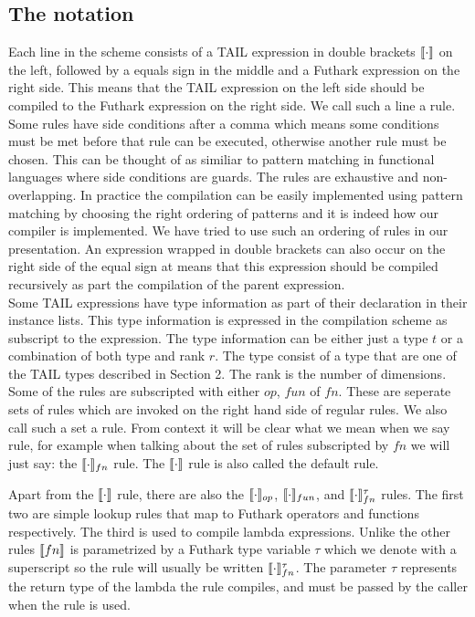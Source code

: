 \documentclass[11pt]{article}
\begin{document}
\subsection{The notation}
Each line in the scheme consists of a TAIL expression in double brackets $\llbracket \cdot \rrbracket$ on the left, followed by a
equals sign in the middle and a Futhark expression on the right side. This means that the TAIL expression on the left
side should be compiled to the Futhark expression on the right side. We call such a line a rule. Some rules have side
conditions after a comma which means some conditions must be met before that rule can be executed, otherwise another
rule must be chosen. This can be thought of as similiar to pattern matching in functional languages where side conditions
are guards. The rules are exhaustive and non-overlapping.
In practice the compilation can be easily implemented using pattern matching by choosing the right ordering of patterns
and it is indeed how our compiler is implemented.
We have tried to use such an ordering of rules in our presentation.
An expression wrapped in double brackets can also occur on the right side of the equal sign at means that this expression
should be compiled recursively as part the compilation of the parent expression.\\

Some TAIL expressions have type information as part of their declaration in their instance lists.
This type information is expressed in the compilation scheme as subscript to the expression.
The type information can be either just a type $t$ or a combination of both type and rank $r$.
The type consist of a type that are one of the TAIL types described in Section 2. The rank is the number of dimensions.  \\

Some of the rules are subscripted with either $op$, $fun$ of $fn$.
These are seperate sets of rules which are invoked on the right hand side of regular rules.
We also call such a set a rule.
From context it will be clear what we mean when we say rule, for example when talking about the set of rules subscripted by
$fn$ we will just say: the $\llbracket \cdot \rrbracket_{fn}$ rule. The $\llbracket \cdot \rrbracket$ rule is also called the default rule.

Apart from the $\llbracket \cdot \rrbracket$ rule, there are also the $\llbracket \cdot \rrbracket_{op}$, $\llbracket \cdot \rrbracket_{fun}$,  and $\llbracket \cdot \rrbracket_{fn}^{\tau}$ rules.
The first two are simple lookup rules that map to Futhark operators and functions respectively.
The third is used to compile lambda expressions.
Unlike the other rules $\llbracket fn \rrbracket$ is parametrized by a Futhark type variable $\tau$ which we denote with a superscript
so the rule will usually be written $\llbracket \cdot \rrbracket_{fn}^{\tau}$.
The parameter $\tau$ represents the return type of the lambda the rule compiles,
and must be passed by the caller when the rule is used.
\end{document}
